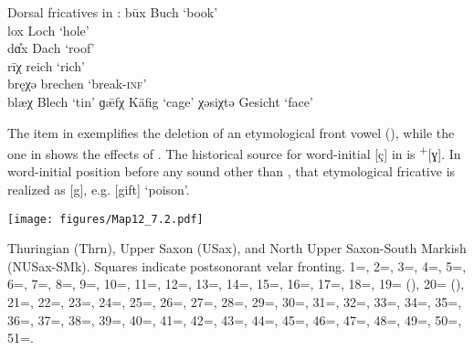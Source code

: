 \ea%
\label{ex:7:22}Dorsal fricatives in :
\ea\label{ex:7:22a} būx \tab  [buːx] \tab Buch \tab ‘book’ \\
lox \tab [lox] \tab Loch \tab ‘hole’ \\
dɑ̊x \tab [dɑx] \tab Dach \tab ‘roof’ \\
\ex\label{ex:7:22b} rīχ \tab  [ʀiːç] \tab reich \tab ‘rich’ \\
bręχə \tab [bʀɛçə] \tab  brechen \tab ‘break\textsc{{}-inf}’ \\
blæχ \tab [blæç] \tab Blech \tab ‘tin’ 
\ex\label{ex:7:22c} ɡ\={æ}fχ \tab [kæːfç] \tab Käfig \tab ‘cage’ 
\ex\label{ex:7:22d} χəsiχtə \tab [çəsiçtə] \tab Gesicht \tab ‘face’ 
 \z
\z 

The item in  exemplifies the deletion of an etymological front vowel (), while the one in  shows the effects of . The historical source for word-initial [ç] in  is  \textsuperscript{+}[ɣ]. In word-initial position before any sound other than , that etymological fricative is realized as [g], e.g. [gift] ‘poison’.

\begin{map}
\texttt{[image: figures/Map12\_7.2.pdf]}
\caption[Thuringian, Upper Saxon, and North Upper Saxon-South Markish]{Thuringian (Thrn), Upper Saxon (USax), and North Upper Saxon-South Markish (NUSax-SMk). Squares indicate postsonorant velar fronting. 1=\citet{Schultze1874}, 2=\citet{Liesenberg1890}, 3=\citet{Flex1893}, 4=\citet{Frank1898}, 5=\citet{Trebs1899}, 6=\citet{Hennemann1901}, 7=\citet{Hentrich1905}, 8=\citet{Daube1906}, 9=\citet{KürstenBremer1910}, 10=\citet{Kürsten1910,Kürsten1911}, 11=\citet{Rasch1912}, 12=\citet{Hankel1913}, 13=\citet{Hentrich1920}, 14=\citet{Rudolph1924}, 15=\citet{Schirmer1932}, 16=\citet{Dietrich1957}, 17=\citet{Spangenberg1962}, 18=\citet{Spangenberg1974,Spangenberg1989}, 19=\citet{Guentherodt1982} (), 20=\citet{Guentherodt1982} (), 21=\citet{Harnisch1987}, 22=\citet{Weldner1991}, 23=\citet{Spangenberg1998}, 24=\citet{Goepfert1878}, 25=\citet{Albrecht1983}, 26=\citet{Hertel1887}, 27=\citet{Philipp1897}, 28=\citet{Hausenblas1898}, 29=\citet{Lang1906}, 30=\citet{Pompé1907}, 31=\citet{Bremer1909}, 32=\citet{Hausenblas1914}, 33=\citet{Große1955}, 34=\citet{Große1957}, 35=\citet{Protze1957}, 36=\citet{Schönfeld1958}, 37=\citet{Fleischer1961}, 38=\citet{Bergmann1965}, 39=\citet{Becker1969}, 40=\citet{BethgeBonnin1969}, 41=\citet{KahnWeise2013}, 42=\citet{Goessgen1902}, 43=\citet{Bischoff1935}, 44=\citet{Kieser1963}, 45=\citet{Seibicke1967}, 46=\citet{Krug1969}, 47=\citet{BethgeBonnin1969}, 48=\citet{Stellmacher1973}, 49=\citet{Langner1977}, 50=\citet{Schönfeld1986}, 51=\citet{Schönfeld2001}.}\label{map:12}
\end{map}

